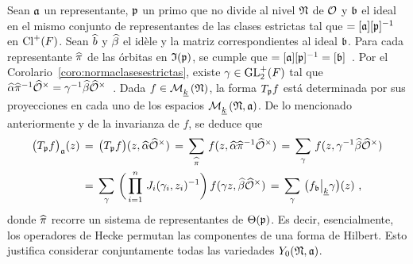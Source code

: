 Sean $\frak{a}$ un representante, $\frak{p}$ un primo que no divide al nivel
$\frak{N}$ de $\cal{O}$ y $\frak{b}$ el ideal en el mismo conjunto de
representantes de las clases estrictas tal que
\begin{math}
	[\frak{b}]=[\frak{a}][\frak{p}]^{-1}
\end{math}
en $\pClass{F}$. Sean $\hhat{b}$ y $\hhat{\beta}$ el id\`{e}le y la matriz
correspondientes al ideal $\frak{b}$. Para cada representante $\hhat{\pi}$ de
las \'{o}rbitas en $\frak{I}(\frak{p})$, se cumple que
\begin{math}
	[\nrd(\hhat{\alpha}\hhat{\pi}^{-1})]=[\frak{a}][\frak{p}]^{-1}=
		[\frak{b}]
\end{math}~.
Por el Corolario~\ref{coro:normaclasesestrictas}, existe
$\gamma\in\GLtp_{2}(F)$ tal que
\begin{math}
	\hhat{\alpha}\hhat{\pi}^{-1}\Idfin{\cal{O}}=
		\gamma^{-1}\hhat{\beta}\Idfin{\cal{O}}
\end{math}~.
Dada $f\in\modularH{k}{\frak{N}}$, la forma $T_{\frak{p}}f$ est\'{a}
determinada por sus proyecciones en cada uno de los espacios
$\modularH{k}{\frak{N},\frak{a}}$. De lo mencionado anteriormente y de la
invarianza de $f$, se deduce que
\begin{align*}
	\big(T_{\frak{p}}f\big)_{\frak{a}} (z) & \,=\,
		\big(T_{\frak{p}}f\big)(z,\hhat{\alpha}\Idfin{\cal{O}}) \,=\,
		\sum_{\hhat{\pi}}\,
			f(z,\hhat{\alpha}\hhat{\pi}^{-1}\Idfin{\cal{O}}) \,=\,
		\sum_{\gamma}\,f(z,\gamma^{-1}\hhat{\beta}\Idfin{\cal{O}}) \\
	& \,=\,\sum_{\gamma}\,
		\bigg(\prod_{i=1}^{n}\,J_{i}(\gamma_{i},z_{i})^{-1}\bigg)\,
		f(\gamma z,\hhat{\beta}\Idfin{\cal{O}}) \,=\,
		\sum_{\gamma}\,\big(f_{\frak{b}}\operadormatrices{\peso{k}}{%
				\gamma}\big)(z)
	\text{ ,}
\end{align*}
%
donde $\hhat{\pi}$ recorre un sistema de representantes de $\Theta(\frak{p})$.
Es decir, esencialmente, los operadores de Hecke permutan las componentes de
una forma de Hilbert. Esto justifica considerar conjuntamente todas las
variedades $Y_{0}(\frak{N},\frak{a})$.

